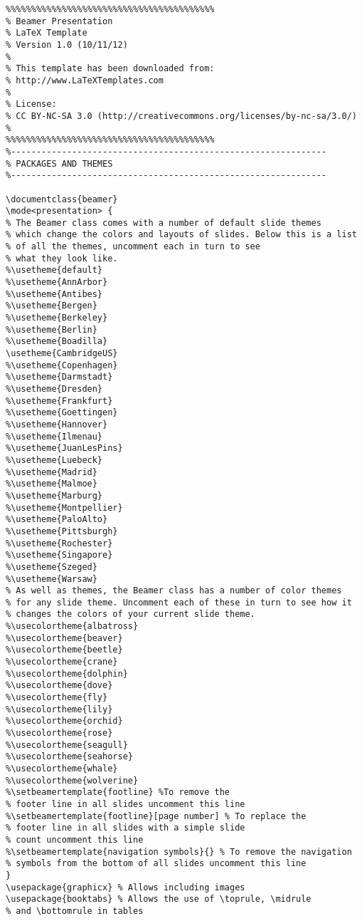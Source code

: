 \documentclass[a4paper,UKenglish,cleveref, autoref, thm-restate]{lipics-v2021}
\begin{document}
\begin{lstlisting}
%%%%%%%%%%%%%%%%%%%%%%%%%%%%%%%%%%%%%%%%%
% Beamer Presentation
% LaTeX Template
% Version 1.0 (10/11/12)
%
% This template has been downloaded from:
% http://www.LaTeXTemplates.com
%
% License:
% CC BY-NC-SA 3.0 (http://creativecommons.org/licenses/by-nc-sa/3.0/)
%
%%%%%%%%%%%%%%%%%%%%%%%%%%%%%%%%%%%%%%%%%
%--------------------------------------------------------------
% PACKAGES AND THEMES
%--------------------------------------------------------------

\documentclass{beamer}
\mode<presentation> {
% The Beamer class comes with a number of default slide themes
% which change the colors and layouts of slides. Below this is a list
% of all the themes, uncomment each in turn to see 
% what they look like.
%\usetheme{default}
%\usetheme{AnnArbor}
%\usetheme{Antibes}
%\usetheme{Bergen}
%\usetheme{Berkeley}
%\usetheme{Berlin}
%\usetheme{Boadilla}
\usetheme{CambridgeUS}
%\usetheme{Copenhagen}
%\usetheme{Darmstadt}
%\usetheme{Dresden}
%\usetheme{Frankfurt}
%\usetheme{Goettingen}
%\usetheme{Hannover}
%\usetheme{Ilmenau}
%\usetheme{JuanLesPins}
%\usetheme{Luebeck}
%\usetheme{Madrid}
%\usetheme{Malmoe}
%\usetheme{Marburg}
%\usetheme{Montpellier}
%\usetheme{PaloAlto}
%\usetheme{Pittsburgh}
%\usetheme{Rochester}
%\usetheme{Singapore}
%\usetheme{Szeged}
%\usetheme{Warsaw}
% As well as themes, the Beamer class has a number of color themes
% for any slide theme. Uncomment each of these in turn to see how it
% changes the colors of your current slide theme.
%\usecolortheme{albatross}
%\usecolortheme{beaver}
%\usecolortheme{beetle}
%\usecolortheme{crane}
%\usecolortheme{dolphin}
%\usecolortheme{dove}
%\usecolortheme{fly}
%\usecolortheme{lily}
%\usecolortheme{orchid}
%\usecolortheme{rose}
%\usecolortheme{seagull}
%\usecolortheme{seahorse}
%\usecolortheme{whale}
%\usecolortheme{wolverine}
%\setbeamertemplate{footline} %To remove the 
% footer line in all slides uncomment this line
%\setbeamertemplate{footline}[page number] % To replace the 
% footer line in all slides with a simple slide 
% count uncomment this line
%\setbeamertemplate{navigation symbols}{} % To remove the navigation 
% symbols from the bottom of all slides uncomment this line
}
\usepackage{graphicx} % Allows including images
\usepackage{booktabs} % Allows the use of \toprule, \midrule 
% and \bottomrule in tables

\end{lstlisting}
\end{document}
